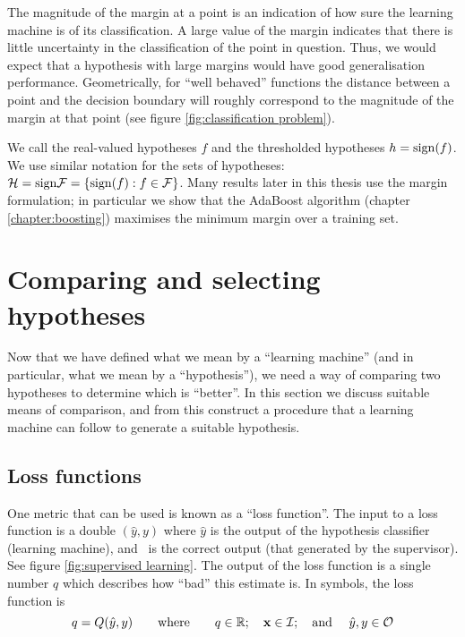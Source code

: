 The magnitude of the margin at a point is an indication of how sure the
learning machine is of its classification.  A large value of the
margin indicates that there is little uncertainty in the
classification of the point in question.  Thus, we would expect that a
hypothesis with large margins would have good generalisation
performance.  Geometrically, for ``well behaved'' functions the
distance between a point and the decision boundary will roughly
correspond to the magnitude of the margin at that point (see figure
\ref{fig:classification problem}).

We call the real-valued hypotheses $f$ and the thresholded
hypotheses $h = \mathrm{sign}(f)$.  We use similar notation for the sets of
hypotheses: $\mathcal{H} = \mathrm{sign} \mathcal{F} = \{ \mathrm{sign}(f) : f \in \mathcal{F} \}$.
Many results later in this thesis use the margin formulation; in
particular we show that the AdaBoost algorithm (chapter
\ref{chapter:boosting}) maximises the minimum margin over a training
set.


\section{Comparing and selecting hypotheses}
\label{sec:erm}

Now that we have defined what we mean by a ``learning machine'' (and
in particular, what we mean by a ``hypothesis''), we need a way of
comparing two hypotheses to determine which is ``better''.  In this
section we discuss suitable means of comparison, and from this
construct a procedure that a learning machine can follow to generate a
suitable hypothesis.


\subsection{Loss functions}
\label{sec:loss function}

One metric that can be used is known as a ``loss function''.  The
input to a loss function is a double $(\hat{y}, y)$ where $\hat{y}$ is
the output of the hypothesis classifier (learning 
machine), and \bfy\ is the correct output (that generated by the
supervisor).  See figure \ref{fig:supervised learning}.  The output of
the loss function is a single number $q$ which describes how ``bad''
this estimate is.  In symbols, the loss function is
%
\begin{equation}
q = Q(\hat{y}, y) \qquad \mbox{where} \qquad q \in \mathbb{R}; \quad
\mathbf{x} \in \mathcal{I}; \quad \mbox{and } \quad \hat{y}, y \in \mathcal{O}
\end{equation}

